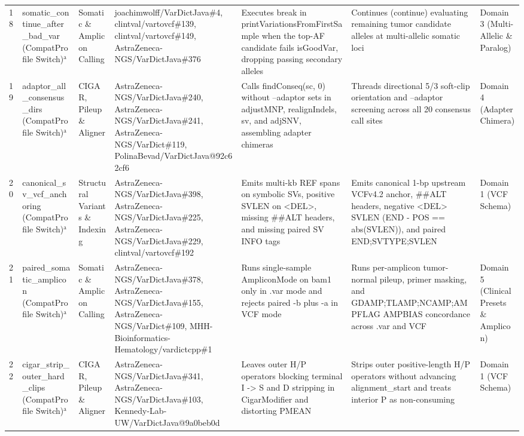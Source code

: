 \begin{table}[htbp]
{\begin{tabular}{lllllll}
18 & somatic\_continue\_after\_bad\_var (CompatProfile Switch)$^{\text{a}}$ & Somatic \& Amplicon Calling & joachimwolff/VarDictJava\#4, clintval/vartovcf\#139, clintval/vartovcf\#149, AstraZeneca-NGS/VarDictJava\#376 & Executes break in printVariationsFromFirstSample when the top-AF candidate fails isGoodVar, dropping passing secondary alleles & Continues (continue) evaluating remaining tumor candidate alleles at multi-allelic somatic loci & Domain 3 (Multi-Allelic \& Paralog) \\
19 & adaptor\_all\_consensus\_dirs (CompatProfile Switch)$^{\text{a}}$ & CIGAR, Pileup \& Aligner & AstraZeneca-NGS/VarDictJava\#240, AstraZeneca-NGS/VarDictJava\#241, AstraZeneca-NGS/VarDict\#119, PolinaBevad/VarDictJava@92c62cf6 & Calls findConseq(sc, 0) without --adaptor sets in adjustMNP, realignIndels, sv, and adjSNV, assembling adapter chimeras & Threads directional 5/3 soft-clip orientation and --adaptor screening across all 20 consensus call sites & Domain 4 (Adapter Chimera) \\
20 & canonical\_sv\_vcf\_anchoring (CompatProfile Switch)$^{\text{a}}$ & Structural Variants \& Indexing & AstraZeneca-NGS/VarDictJava\#398, AstraZeneca-NGS/VarDictJava\#225, AstraZeneca-NGS/VarDictJava\#229, clintval/vartovcf\#192 & Emits multi-kb REF spans on symbolic SVs, positive SVLEN on \textless{}DEL\textgreater{}, missing \#\#ALT headers, and missing paired SV INFO tags & Emits canonical 1-bp upstream VCFv4.2 anchor, \#\#ALT headers, negative \textless{}DEL\textgreater{} SVLEN (END - POS == abs(SVLEN)), and paired END;SVTYPE;SVLEN & Domain 1 (VCF Schema) \\
21 & paired\_somatic\_amplicon (CompatProfile Switch)$^{\text{a}}$ & Somatic \& Amplicon Calling & AstraZeneca-NGS/VarDictJava\#378, AstraZeneca-NGS/VarDictJava\#155, AstraZeneca-NGS/VarDict\#109, MHH-Bioinformatics-Hematology/vardictcpp\#1 & Runs single-sample AmpliconMode on bam1 only in .var mode and rejects paired -b plus -a in VCF mode & Runs per-amplicon tumor-normal pileup, primer masking, and GDAMP;TLAMP;NCAMP;AMPFLAG AMPBIAS concordance across .var and VCF & Domain 5 (Clinical Presets \& Amplicon) \\
22 & cigar\_strip\_outer\_hard\_clips (CompatProfile Switch)$^{\text{a}}$ & CIGAR, Pileup \& Aligner & AstraZeneca-NGS/VarDictJava\#341, AstraZeneca-NGS/VarDictJava\#103, Kennedy-Lab-UW/VarDictJava@9a0beb0d & Leaves outer H/P operators blocking terminal I -\textgreater{} S and D stripping in CigarModifier and distorting PMEAN & Strips outer positive-length H/P operators without advancing alignment\_start and treats interior P as non-consuming & Domain 1 (VCF Schema) \\

\end{tabular}}
\end{table}
